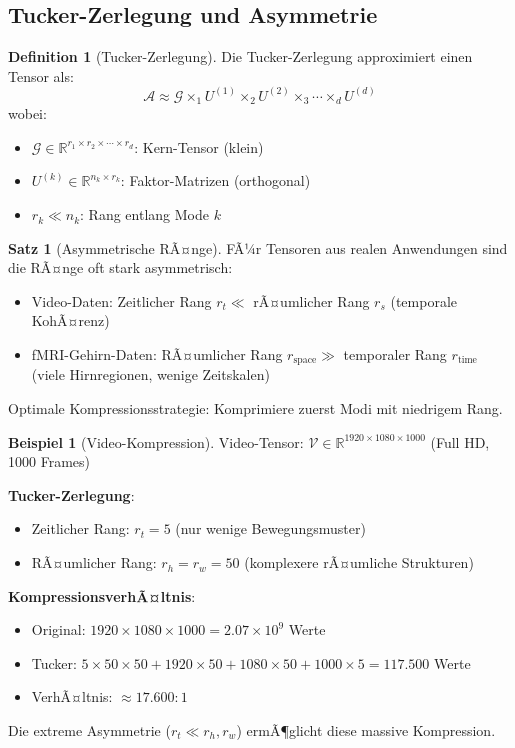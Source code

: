 ﻿\documentclass[a4paper,12pt]{report}
\theoremstyle{definition}
\newtheorem{definition}{Definition}
\newtheorem{beispiel}{Beispiel}
\newtheorem{satz}{Satz}
\begin{document}
	\subsection{Tucker-Zerlegung und Asymmetrie}
	
	\begin{definition}[Tucker-Zerlegung]
		Die Tucker-Zerlegung approximiert einen Tensor als:
		\[
		\mathcal{A} \approx \mathcal{G} \times_1 U^{(1)} \times_2 U^{(2)} \times_3 \cdots \times_d U^{(d)}
		\]
		wobei:
		\begin{itemize}
			\item $\mathcal{G} \in \mathbb{R}^{r_1 \times r_2 \times \cdots \times r_d}$: Kern-Tensor (klein)
			\item $U^{(k)} \in \mathbb{R}^{n_k \times r_k}$: Faktor-Matrizen (orthogonal)
			\item $r_k \ll n_k$: Rang entlang Mode $k$
		\end{itemize}
	\end{definition}
	
	\begin{satz}[Asymmetrische RÃ¤nge]
		FÃ¼r Tensoren aus realen Anwendungen sind die RÃ¤nge oft stark asymmetrisch:
		\begin{itemize}
			\item Video-Daten: Zeitlicher Rang $r_t \ll$ rÃ¤umlicher Rang $r_s$ (temporale KohÃ¤renz)
			\item fMRI-Gehirn-Daten: RÃ¤umlicher Rang $r_{\text{space}} \gg$ temporaler Rang $r_{\text{time}}$ (viele Hirnregionen, wenige Zeitskalen)
		\end{itemize}
		
		Optimale Kompressionsstrategie: Komprimiere zuerst Modi mit niedrigem Rang.
	\end{satz}
	
	\begin{beispiel}[Video-Kompression]
		Video-Tensor: $\mathcal{V} \in \mathbb{R}^{1920 \times 1080 \times 1000}$ (Full HD, 1000 Frames)
		
		\textbf{Tucker-Zerlegung}:
		\begin{itemize}
			\item Zeitlicher Rang: $r_t = 5$ (nur wenige Bewegungsmuster)
			\item RÃ¤umlicher Rang: $r_h = r_w = 50$ (komplexere rÃ¤umliche Strukturen)
		\end{itemize}
		
		\textbf{KompressionsverhÃ¤ltnis}:
		\begin{itemize}
			\item Original: $1920 \times 1080 \times 1000 = 2.07 \times 10^9$ Werte
			\item Tucker: $5 \times 50 \times 50 + 1920 \times 50 + 1080 \times 50 + 1000 \times 5 = 117.500$ Werte
			\item VerhÃ¤ltnis: $\approx 17.600:1$
		\end{itemize}
		
		Die extreme Asymmetrie ($r_t \ll r_h, r_w$) ermÃ¶glicht diese massive Kompression.
	\end{beispiel}
	
\end{document}
